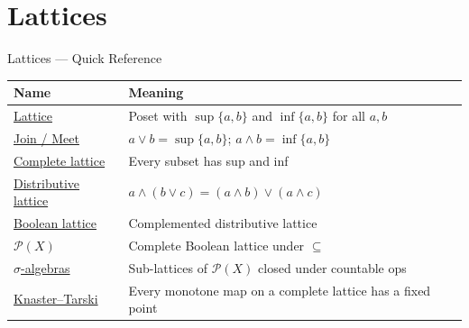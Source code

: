 \section{Lattices}

\begin{toolkitbox}{Lattices --- Quick Reference}
\small
\begin{tabular}{l l}
\toprule
\textbf{Name}  & \textbf{Meaning} \\
\midrule
\hyperref[def:lattice]{Lattice}               & Poset with $\sup\{a,b\}$ and $\inf\{a,b\}$ for all $a,b$   \\
\hyperref[def:lattice]{Join / Meet}           & $a \vee b = \sup\{a,b\}$; $a \wedge b = \inf\{a,b\}$        \\
\hyperref[def:complete-lattice]{Complete lattice}      & Every subset has sup and inf                                \\
\hyperref[def:distributive-lattice]{Distributive lattice}  & $a \wedge (b \vee c) = (a \wedge b) \vee (a \wedge c)$      \\
\hyperref[def:boolean-lattice]{Boolean lattice}       & Complemented distributive lattice                           \\
\hyperref[def:lattice]{$\mathcal{P}(X)$}      & Complete Boolean lattice under $\subseteq$                  \\
\hyperref[def:boolean-lattice]{$\sigma$-algebras}     & Sub-lattices of $\mathcal{P}(X)$ closed under countable ops  \\
\hyperref[thm:knaster-tarski]{Knaster--Tarski}       & Every monotone map on a complete lattice has a fixed point   \\
\bottomrule
\end{tabular}
\end{toolkitbox}


